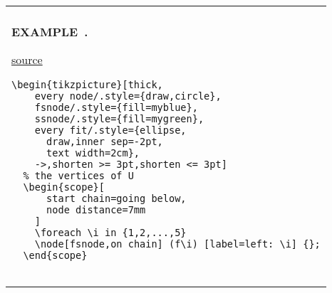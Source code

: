 \documentclass{article}
\newcounter{example}[section]
\newenvironment{example}[1][]{\refstepcounter{example}\par\medskip
  \begin{tabular}{|p{\textwidth}|}\hline\\{\bf EXAMPLE~\theexample. #1}}{\\\hline \end{tabular}}
\begin{document}
\bigskip


\begin{example}

  \begin{multicols}{2}
  \begin{center}
    
    \begin{tikzpicture}[thick,
        every node/.style={draw,circle},
        fsnode/.style={fill=myblue},
        ssnode/.style={fill=mygreen},
        every fit/.style={ellipse,
          draw,inner sep=-2pt,
          text width=2cm},
        ->,shorten >= 3pt,shorten <= 3pt]
      \begin{scope}[start chain=going below,node distance=7mm]
        \foreach \i in {1,2,...,5}
        \node[fsnode,on chain] (f\i) [label=left: \i] {};
      \end{scope}

      \begin{scope}[xshift=4cm,yshift=-0.5cm,start chain=going below,node distance=7mm]
        \foreach \i in {6,7,...,9}
        \node[ssnode,on chain] (s\i) [label=right: \i] {};
      \end{scope}

      \node [myblue,fit=(f1) (f5),label=above:$U$] {};
      \node [mygreen,fit=(s6) (s9),label=above:$V$] {};
      
      \draw (f1) -- (s6); \draw (s6) -- (f2); \draw (f2) -- (s7);
      \draw (s7) -- (f3); \draw (s8) -- (f3); \draw (f3) -- (s9);
      \draw (s9) -- (f5); \draw (f5) -- (s6);
    \end{tikzpicture}


    \columnbreak

    \underline{source}
    {\small 
    \begin{verbatim}
\begin{tikzpicture}[thick,
    every node/.style={draw,circle},
    fsnode/.style={fill=myblue},
    ssnode/.style={fill=mygreen},
    every fit/.style={ellipse,
      draw,inner sep=-2pt,
      text width=2cm},
    ->,shorten >= 3pt,shorten <= 3pt]
  % the vertices of U
  \begin{scope}[
      start chain=going below,
      node distance=7mm
    ]
    \foreach \i in {1,2,...,5}
    \node[fsnode,on chain] (f\i) [label=left: \i] {};
  \end{scope}


\end{verbatim}}
\end{center}
\end{multicols}
\end{example}
\end{document}
